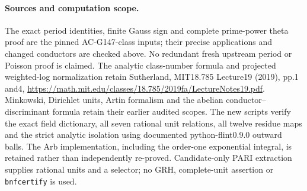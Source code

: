 \paragraph{Sources and computation scope.}
The exact period identities, finite Gauss sign and complete
prime-power theta proof are the pinned AC-G147-class inputs;
their precise applications and changed conductors are checked above.
No redundant fresh upstream period or Poisson proof is claimed.
The analytic class-number formula and projected weighted-log
normalization retain Sutherland, MIT18.785 Lecture19 (2019),
pp.1 and4,
\url{https://math.mit.edu/classes/18.785/2019fa/LectureNotes19.pdf}.
Minkowski, Dirichlet units, Artin formalism and the abelian
conductor--discriminant formula retain their earlier audited scopes.
The new scripts verify the exact field dictionary, all seven
rational unit relations, all twelve residue maps and the strict
analytic isolation using documented python-flint0.9.0 outward balls.
The Arb implementation, including the order-one exponential
integral, is retained rather than independently re-proved.
Candidate-only PARI extraction supplies rational units and a
selector; no GRH, complete-unit assertion or \texttt{bnfcertify}
is used.
